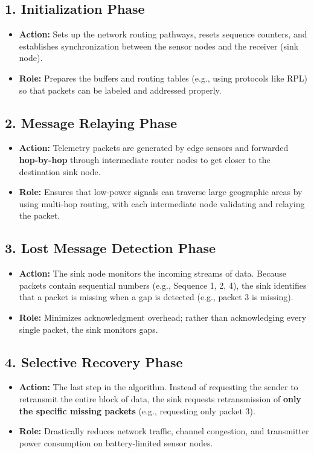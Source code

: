 \subsection{1. Initialization Phase}
\begin{itemize}
  \item   \textbf{Action:} Sets up the network routing pathways, resets sequence counters, and establishes synchronization between the sensor nodes and the receiver (sink node).
  \item   \textbf{Role:} Prepares the buffers and routing tables (e.g., using protocols like RPL) so that packets can be labeled and addressed properly.
\end{itemize}

\subsection{2. Message Relaying Phase}
\begin{itemize}
  \item   \textbf{Action:} Telemetry packets are generated by edge sensors and forwarded \textbf{hop-by-hop} through intermediate router nodes to get closer to the destination sink node.
  \item   \textbf{Role:} Ensures that low-power signals can traverse large geographic areas by using multi-hop routing, with each intermediate node validating and relaying the packet.
\end{itemize}

\subsection{3. Lost Message Detection Phase}
\begin{itemize}
  \item   \textbf{Action:} The sink node monitors the incoming streams of data. Because packets contain sequential numbers (e.g., Sequence 1, 2, 4), the sink identifies that a packet is missing when a gap is detected (e.g., packet 3 is missing).
  \item   \textbf{Role:} Minimizes acknowledgment overhead; rather than acknowledging every single packet, the sink monitors gaps.
\end{itemize}

\subsection{4. Selective Recovery Phase}
\begin{itemize}
  \item   \textbf{Action:} The last step in the algorithm. Instead of requesting the sender to retransmit the entire block of data, the sink requests retransmission of \textbf{only the specific missing packets} (e.g., requesting only packet 3).
  \item   \textbf{Role:} Drastically reduces network traffic, channel congestion, and transmitter power consumption on battery-limited sensor nodes.
\end{itemize}


